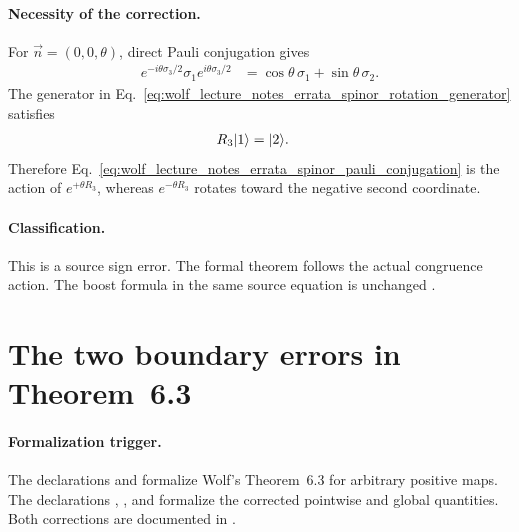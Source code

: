 \documentclass{article}
\begin{document}
\paragraph{Necessity of the correction.}
For $\vec n=(0,0,\theta)$, direct Pauli conjugation gives
\begin{align}
    e^{-i\theta\sigma_3/2}\sigma_1e^{i\theta\sigma_3/2}
        &=\cos\theta\,\sigma_1+\sin\theta\,\sigma_2.
    \label{eq:wolf_lecture_notes_errata_spinor_pauli_conjugation}
\end{align}
The generator in
Eq.~\ref{eq:wolf_lecture_notes_errata_spinor_rotation_generator} satisfies
\begin{align}
    R_3|1\rangle
        &=|2\rangle.
    \label{eq:wolf_lecture_notes_errata_spinor_generator_action}
\end{align}
Therefore
Eq.~\ref{eq:wolf_lecture_notes_errata_spinor_pauli_conjugation} is the action
of $e^{+\theta R_3}$, whereas $e^{-\theta R_3}$ rotates toward the negative
second coordinate.

\paragraph{Classification.}
This is a source sign error. The formal theorem follows the actual congruence
action. The boost formula in the same source equation is unchanged
\cite[Equation~(2.44)]{Wolf2012Quantum}.

\section{The two boundary errors in Theorem~6.3}
\label{sec:theorem-6-3}

\paragraph{Formalization trigger.}
The declarations
 and
 formalize
Wolf's Theorem~6.3 for arbitrary positive maps. The declarations
,
, and
formalize the corrected pointwise and global quantities. Both corrections are
documented in
.
\end{document}
